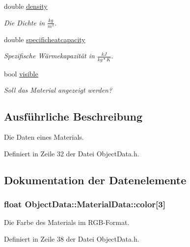 \begin{DoxyCompactItemize}
double \hyperlink{structObjectData_1_1MaterialData_a49cbca11f42993f41497e725fe8ca68c}{density}
\begin{DoxyCompactList}\small\item\em Die Dichte in $\frac{kg}{m^3}$. \end{DoxyCompactList}\item 
double \hyperlink{structObjectData_1_1MaterialData_a784e2b70f98d146979fd422d41445fea}{specificheatcapacity}
\begin{DoxyCompactList}\small\item\em Spezifische Wärmekapazität in $\frac{kJ}{kg*K}$. \end{DoxyCompactList}\item 
bool \hyperlink{structObjectData_1_1MaterialData_a37980da11f6b51b30eb41c3ab4e9674a}{visible}
\begin{DoxyCompactList}\small\item\em Soll das Material angezeigt werden? \end{DoxyCompactList}\end{DoxyCompactItemize}


\subsection{Ausführliche Beschreibung}
Die Daten eines Materials. 

Definiert in Zeile 32 der Datei Object\-Data.\-h.



\subsection{Dokumentation der Datenelemente}
\hypertarget{structObjectData_1_1MaterialData_a3930f8e673d50b88c9234c7f73c16a91}{
\subsubsection[{color}]{\setlength{\rightskip}{0pt plus 5cm}float Object\-Data\-::\-Material\-Data\-::color\mbox{[}3\mbox{]}}}\label{structObjectData_1_1MaterialData_a3930f8e673d50b88c9234c7f73c16a91}


Die Farbe des Materials im R\-G\-B-\/\-Format. 



Definiert in Zeile 38 der Datei Object\-Data.\-h.

